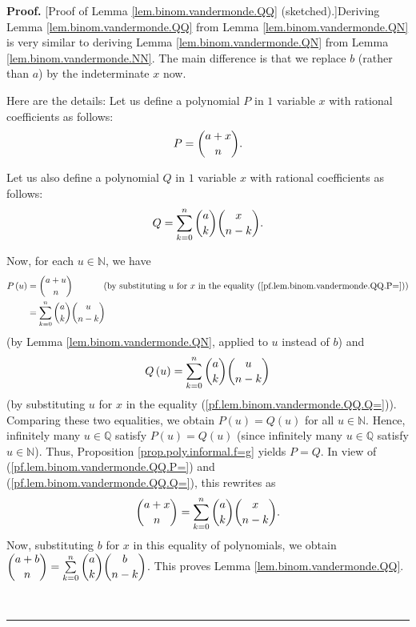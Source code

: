 \documentclass[numbers=enddot,12pt,final,onecolumn,notitlepage]{scrartcl}%
\numberwithin{exer}{subsection}
\theoremstyle{definition}
\newenvironment{fineprint}{\begin{small}}{\end{small}}
\newenvironment{proof}[1][Proof]{\noindent\textbf{#1.} }{\ \rule{0.5em}{0.5em}}
\let\sumnonlimits\sum
\renewcommand{\sum}{\sumnonlimits\limits}
\begin{document}
\begin{proof}
[Proof of Lemma \ref{lem.binom.vandermonde.QQ} (sketched).]Deriving Lemma
\ref{lem.binom.vandermonde.QQ} from Lemma \ref{lem.binom.vandermonde.QN} is
very similar to deriving Lemma \ref{lem.binom.vandermonde.QN} from Lemma
\ref{lem.binom.vandermonde.NN}. The main difference is that we replace $b$
(rather than $a$) by the indeterminate $x$ now.

\begin{fineprint}
Here are the details: Let us define a polynomial $P$ in $1$ variable $x$ with
rational coefficients as follows:%
\begin{equation}
P=\dbinom{a+x}{n}. \label{pf.lem.binom.vandermonde.QQ.P=}%
\end{equation}


Let us also define a polynomial $Q$ in $1$ variable $x$ with rational
coefficients as follows:%
\begin{equation}
Q=\sum_{k=0}^{n}\dbinom{a}{k}\dbinom{x}{n-k}.
\label{pf.lem.binom.vandermonde.QQ.Q=}%
\end{equation}


Now, for each $u\in\mathbb{N}$, we have%
\begin{align*}
P\left(  u\right)   &  =\dbinom{a+u}{n}\ \ \ \ \ \ \ \ \ \ \left(  \text{by
substituting }u\text{ for }x\text{ in the equality
(\ref{pf.lem.binom.vandermonde.QQ.P=})}\right) \\
&  =\sum_{k=0}^{n}\dbinom{a}{k}\dbinom{u}{n-k}%
\end{align*}
(by Lemma \ref{lem.binom.vandermonde.QN}, applied to $u$ instead of $b$) and%
\[
Q\left(  u\right)  =\sum_{k=0}^{n}\dbinom{a}{k}\dbinom{u}{n-k}%
\]
(by substituting $u$ for $x$ in the equality
(\ref{pf.lem.binom.vandermonde.QQ.Q=})). Comparing these two equalities, we
obtain $P\left(  u\right)  =Q\left(  u\right)  $ for all $u\in\mathbb{N}$.
Hence, infinitely many $u\in\mathbb{Q}$ satisfy $P\left(  u\right)  =Q\left(
u\right)  $ (since infinitely many $u\in\mathbb{Q}$ satisfy $u\in\mathbb{N}$).
Thus, Proposition \ref{prop.poly.informal.f=g} yields $P=Q$. In view of
(\ref{pf.lem.binom.vandermonde.QQ.P=}) and
(\ref{pf.lem.binom.vandermonde.QQ.Q=}), this rewrites as%
\[
\dbinom{a+x}{n}=\sum_{k=0}^{n}\dbinom{a}{k}\dbinom{x}{n-k}.
\]
Now, substituting $b$ for $x$ in this equality of polynomials, we obtain
$\dbinom{a+b}{n}=\sum_{k=0}^{n}\dbinom{a}{k}\dbinom{b}{n-k}$. This proves
Lemma \ref{lem.binom.vandermonde.QQ}.
\end{fineprint}
\end{proof}
\end{document}
